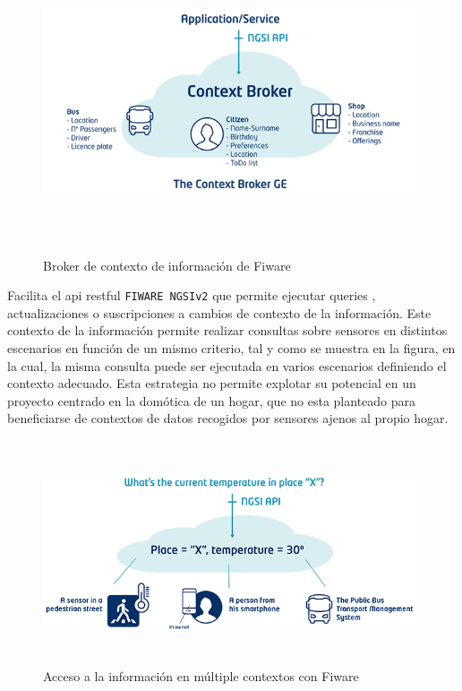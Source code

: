 \vspace{0.5cm}
\begin{figure}[hbt!]
\label{fiwarecontext}
\centering
\includegraphics[height=3.5in]{figures/fiware_context_broker.png}
\caption[Broker de contexto de información de Fiware]{Broker de contexto de información de Fiware}
\end{figure}

Facilita el \gls{api} restful \verb|FIWARE NGSIv2| que permite ejecutar queries , actualizaciones o suscripciones a cambios de contexto de la información. Este contexto de la información permite realizar consultas sobre sensores en distintos escenarios en función de un mismo criterio, tal y como se muestra en la figura, en la cual, la misma consulta puede ser ejecutada en varios escenarios definiendo el contexto adecuado. Esta estrategia no permite explotar su potencial en un proyecto centrado en la domótica de un hogar, que no esta planteado para beneficiarse de contextos de datos recogidos por sensores ajenos al propio hogar.

\vspace{0.5cm}
\begin{figure}[hbt!]
\label{fiwarechangecontext}
\centering
\includegraphics[height=2.6in]{figures/fiware_context_change.png}
\caption[Acceso a la información en múltiple contextos con Fiware]{Acceso a la información en múltiple contextos con Fiware}
\end{figure}


